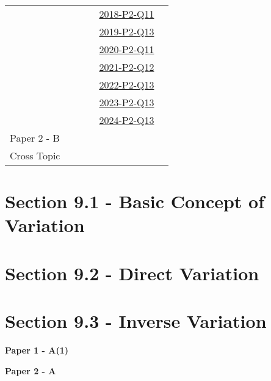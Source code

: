 \documentclass[12pt, a4paper]{article}
\begin{document}
\begin{absolutelynopagebreak}
\begin{center}
\begin{tabular}{|l|c|c|c|c|c|}
&  &  &  & \hyperref[DSE2018-CoreP2-Q11]{2018-P2-Q11} &  \\
&  &  &  & \hyperref[DSE2019-CoreP2-Q13]{2019-P2-Q13} &  \\
&  &  &  & \hyperref[DSE2020-CoreP2-Q11]{2020-P2-Q11} &  \\
&  &  &  & \hyperref[DSE2021-CoreP2-Q12]{2021-P2-Q12} &  \\
&  &  &  & \hyperref[DSE2022-CoreP2-Q13]{2022-P2-Q13} &  \\
&  &  &  & \hyperref[DSE2023-CoreP2-Q13]{2023-P2-Q13} &  \\
&  &  &  & \hyperref[DSE2024-CoreP2-Q13]{2024-P2-Q13} &  \\
\hline
Paper 2 - B&  &  &  &  &  \\
\hline
\hline
Cross Topic&  &  &  &  &  \\
\hline
\end{tabular}
\end{center}
\end{absolutelynopagebreak}




\section*{Section 9.1 - Basic Concept of Variation}\label{section:4-9-1}





\section*{Section 9.2 - Direct Variation}\label{section:4-9-2}





\section*{Section 9.3 - Inverse Variation}\label{section:4-9-3}

\textbf{Paper 1 - A(1)}
\begin{enumx}[label=\arabic*.,start=1]
\item {}\label{DSE2017-CoreP1-Q08} 
\end{enumx}
\textbf{Paper 2 - A}
\begin{enumx}[label=\arabic*.,start=2]
\item {}\label{DSE2013-CoreP2-Q28} 
\end{enumx}
\end{document}
